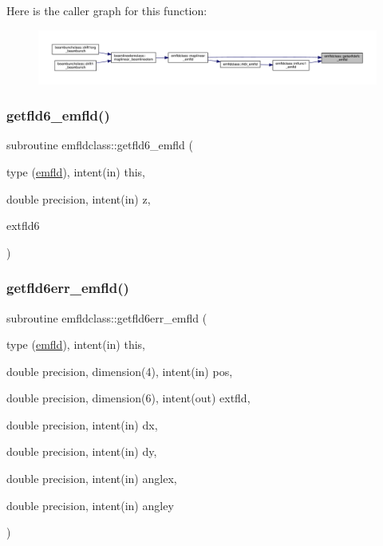 Here is the caller graph for this function\+:\nopagebreak
\begin{figure}[H]
\begin{center}
\leavevmode
\includegraphics[width=350pt]{namespaceemfldclass_ae77f42a7f667c3dd902df1d26480e602_icgraph}
\end{center}
\end{figure}
\mbox{\label{namespaceemfldclass_a7eb67a0a1ce6ea3f37b4c55e40048f4a}} 
\subsubsection{\texorpdfstring{getfld6\_emfld()}{getfld6\_emfld()}}
{\footnotesize\ttfamily subroutine emfldclass\+::getfld6\+\_\+emfld (\begin{DoxyParamCaption}\item[{type (\mbox{\hyperlink{namespaceemfldclass_structemfldclass_1_1emfld}{emfld}}), intent(in)}]{this,  }\item[{double precision, intent(in)}]{z,  }\item[{}]{extfld6 }\end{DoxyParamCaption})}

\mbox{\label{namespaceemfldclass_ab5c872006557986fafd6080666ca68f1}} 
\subsubsection{\texorpdfstring{getfld6err\_emfld()}{getfld6err\_emfld()}}
{\footnotesize\ttfamily subroutine emfldclass\+::getfld6err\+\_\+emfld (\begin{DoxyParamCaption}\item[{type (\mbox{\hyperlink{namespaceemfldclass_structemfldclass_1_1emfld}{emfld}}), intent(in)}]{this,  }\item[{double precision, dimension(4), intent(in)}]{pos,  }\item[{double precision, dimension(6), intent(out)}]{extfld,  }\item[{double precision, intent(in)}]{dx,  }\item[{double precision, intent(in)}]{dy,  }\item[{double precision, intent(in)}]{anglex,  }\item[{double precision, intent(in)}]{angley }\end{DoxyParamCaption})}

